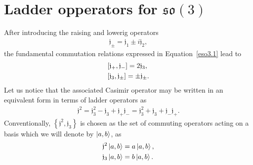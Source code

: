 \documentclass[12pt,a4paper]{report}
\theoremstyle{definition}
\theoremstyle{remark}
\theoremstyle{remark}
\begin{document}
\section{Ladder opperators for $\mathfrak{so}(3)$}\label{ladderso3}
After introducing the raising and lowerig operators
\begin{align*}
\mathfrak{j}_\pm=\mathfrak{j}_1\pm i\mathfrak{j}_2,
\end{align*}
the fundamental commutation relations expressed in Equation~\ref{eso3.1} lead to
\begin{equation}\label{eso3.2}
\begin{aligned}\relax
&[\mathfrak{j}_+,\mathfrak{j}_-]=2\mathfrak{j}_3,\\
&[\mathfrak{j}_3,\mathfrak{j}_\pm]=\pm\mathfrak{j}_\pm.
\end{aligned}
\end{equation}
Let us notice that the associated Casimir operator may be written in an equivalent form in terms of ladder operators as
\begin{equation}\label{eso3.5}
\begin{aligned}
\mathfrak{j}^2=\mathfrak{j}_3^2-\mathfrak{j}_3+\mathfrak{j}_+\mathfrak{j}_-=\mathfrak{j}_3^2+\mathfrak{j}_3+\mathfrak{j}_-\mathfrak{j}_+.
\end{aligned}
\end{equation}
Conventionally\cite{adams}\cite{zetilli}\cite{sakurai}, $\left\lbrace \mathfrak{j}^2,\mathfrak{j}_3 \right\rbrace$ is chosen as the set of commuting operators acting on a basis which we will denote by $\ket{a,b}$, as
\begin{align*}
\mathfrak{j}^2\ket{a,b}&=a\ket{a,b},\\
\mathfrak{j}_3\ket{a,b}&=b\ket{a,b}.
\end{align*}
\end{document}
